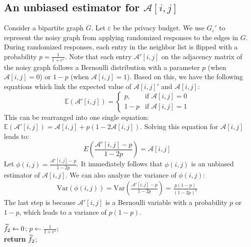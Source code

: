 \subsection{An unbiased estimator for $\mathcal{A}[i,j]$}
Consider a bipartite graph $G$. Let $\varepsilon$ be the privacy budget. We use $G_{\varepsilon}'$ to represent the noisy graph from applying randomized responses to the edges in $G$. 
During randomized responses, each entry in the neighbor list is flipped with a probability $p  = \frac{1}{1+e^{\varepsilon}}$. 
Note that each entry $\mathcal{A}'[i,j]$ on the adjacency matrix of the noisy graph follows a Bernoulli distribution with a parameter $p$ (when $\mathcal{A}[i,j]=0$) or $1-p$ (when  $\mathcal{A}[i,j]=1$). 
Based on this, we have the following equations which link the expected value of $\mathcal{A}[i,j]'$ and $\mathcal{A}[i,j]$: 
$$
\mathbb{E}(\mathcal{A}'[i,j] ) =
\begin{cases}
    p, & \text{if } \mathcal{A}[i,j] = 0 \\
    1-p & \text{if } \mathcal{A}[i,j]  = 1
\end{cases}
$$
This can be rearranged into one single equation: 
$
\mathbb{E}(\mathcal{A}'[i,j] ) =  \mathcal{A}[i,j] + p (1- 2 \mathcal{A}[i,j])$. 
Solving this equation for $\mathcal{A}[i,j]$ leads to: 
$$
E(\frac{\mathcal{A}'[i,j]  - p }{1-2p}) = \mathcal{A}[i,j]
$$
Let $\phi(i,j) = \frac{\mathcal{A}'[i,j]  - p }{1-2p}$. It immediately follows that $\phi(i,j)$ is an unbiased estimator of $\mathcal{A}[i,j]$. We can also analyze the variance of $\phi(i,j)$: 
\begin{align}
    \mathrm{Var}(\phi(i,j)) =  \mathrm{Var}(\frac{\mathcal{A}'[i,j]  - p }{1-2p}) 
    = \frac{p(1-p)}{(1-2p)^2}   
    \label{eq:phi.var}
\end{align}
The last step is because $\mathcal{A}'[i,j]$ is a Bernoulli variable with a probability $p$ or $1-p$, which leads to a variance of $p(1-p)$. 
\begin{algorithm}[tbh]
    \small
	\caption{\bs}
	\label{algo:bs}
	\LinesNumbered
        
        $\widetilde{f}_2 \gets 0$; $p \gets \frac{1}{1 + e ^{\varepsilon}}$;\\
        \textbf{return} $\widetilde{f}_2$;\\
\end{algorithm}

